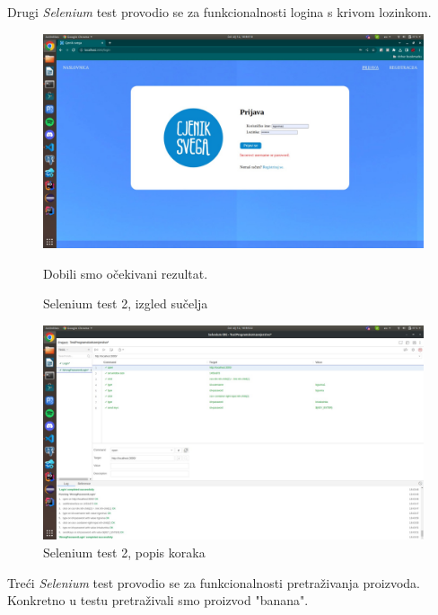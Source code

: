 			Drugi \textit{Selenium} test provodio se za funkcionalnosti logina s krivom lozinkom. 
			
			\begin{figure}[H]
			\includegraphics[width=\textwidth]{slike/sel2a.jpeg} %
			\caption{Selenium test 2, izgled sučelja}
			\label{fig:sel2a} %
			Dobili smo očekivani rezultat.
			\end{figure}
			\begin{figure}[H]
			\includegraphics[width=\textwidth]{slike/sel2b.jpeg} %
			\caption{Selenium test 2, popis koraka}
			\label{fig:sel2b} %
			\end{figure}
			
			Treći \textit{Selenium} test provodio se za funkcionalnosti pretraživanja proizvoda. Konkretno u testu pretraživali smo proizvod "banana". 
			
